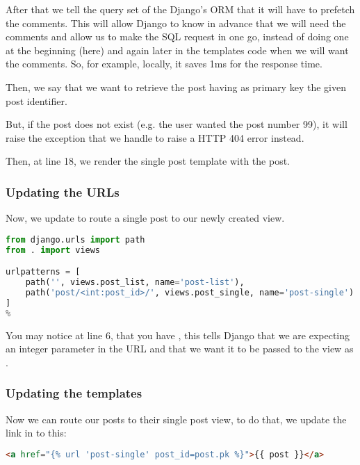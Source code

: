         After that we tell the query set of the Django's ORM that it will have to
        prefetch the  comments. This will allow Django to know in advance 
        that we will need the comments and allow us to make the SQL request in one go,
        instead of doing one at the beginning (here) and again later in the templates 
        code when we will want the comments. So, for example, locally, 
        it saves 1ms for the response time.
        
        Then, we say that we want to retrieve the post having as primary key the given
        post identifier.
        
        But, if the post does not exist (e.g. the user wanted the post number 99),
        it will raise the  exception that we handle to raise
        a HTTP 404 error instead.
        
        Then, at line 18, we render the single post template with the post.
        
    \subsubsection{Updating the URLs}
        Now, we update  to route a single post to our newly created
         view.
        
        \begin{lstlisting}[language=python, title=blog/urls.py]
from django.urls import path
from . import views

urlpatterns = [
    path('', views.post_list, name='post-list'),
    path('post/<int:post_id>/', views.post_single, name='post-single')
]
%
        \end{lstlisting}
        
        You may notice at line 6, that you have , 
        this tells Django that we are expecting an integer parameter in the URL
        and that we want it to be passed to the view as .
        
    \subsubsection{Updating the templates}
        Now we can route our posts to their single post view, to do that, 
        we update the link in  to this:
        
        \begin{lstlisting}[language=html, numbers=none, escapechar=~]
<a href="{% url 'post-single' post_id=post.pk %}">{{ post }}</a>
        \end{lstlisting}
        
